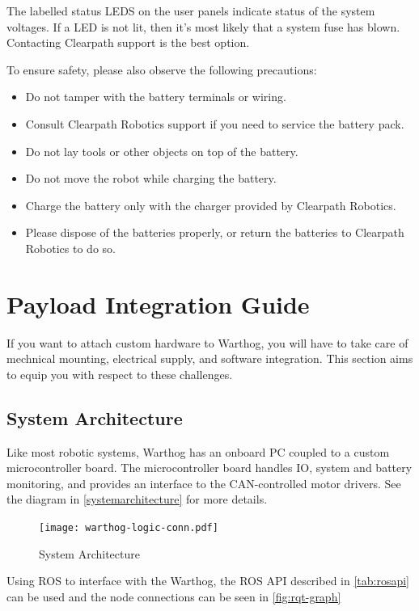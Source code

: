 \documentclass[]{clearpath-latex/clearpath-manual}
\begin{document}
The labelled status LEDS on the user panels indicate status of the system voltages. If a LED is not lit, then it's most likely that a system fuse has blown. Contacting Clearpath support is the best option.

To ensure safety, please also observe the following precautions:

\begin{itemize}[nolistsep]
  \item Do not tamper with the battery terminals or wiring.
  \item Consult Clearpath Robotics support if you need to service the battery pack.
  \item Do not lay tools or other objects on top of the battery.
  \item Do not move the robot while charging the battery.
  \item Charge the battery only with the charger provided by Clearpath Robotics.
  \item Please dispose of the batteries properly, or return the batteries to Clearpath Robotics to do so.
\end{itemize}


\section{Payload Integration Guide}

If you want to attach custom hardware to Warthog, you will have to take care of mechnical mounting, electrical supply, and software integration.  This section aims to equip you with respect to these challenges.

\subsection{System Architecture}

Like most robotic systems, Warthog has an onboard PC coupled to a custom microcontroller board. The microcontroller board handles IO, system and battery monitoring, and provides an interface to the CAN-controlled motor drivers. See the diagram in \autoref{systemarchitecture} for more details.

\begin{figure}[!htb]
  \centering
  \texttt{[image: warthog-logic-conn.pdf]}
  \caption{System Architecture}
  \label{systemarchitecture}
\end{figure}

Using ROS to interface with the Warthog, the ROS API described in \autoref{tab:rosapi} can be used and the node connections can be seen in \autoref{fig:rqt-graph}
\end{document}

